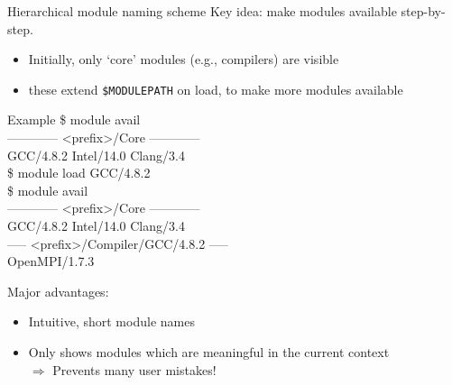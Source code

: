 \documentclass[10pt,xcolor={usenames,dvipsnames}]{beamer}
\begin{document}
\begin{frame}{Hierarchical module naming scheme}
    Key idea: make modules available step-by-step.
    \begin{itemize}
        \item
            Initially, only `core' modules (e.g., compilers) are visible
        \item
            these extend \texttt{\$MODULEPATH} on load, to make
            more modules available
    \end{itemize}
    \enskip
    \begin{minipage}{0.9\textwidth}
        \begin{exampleblock}{Example}
            \ttfamily\footnotesize{
            \$ module avail\\
            ------------ <prefix>/Core ------------\\
            GCC/4.8.2 \quad Intel/14.0 \quad Clang/3.4\\
            \$ module load GCC/4.8.2\\
            \$ module avail\\
            ------------ <prefix>/Core ------------\\
            GCC/4.8.2 \quad Intel/14.0 \quad Clang/3.4\\
            ----- <prefix>/Compiler/GCC/4.8.2 -----\\
            OpenMPI/1.7.3}
        \end{exampleblock}
    \end{minipage}
    \smallskip
    Major advantages:
    \begin{itemize}
        \item
            Intuitive, short module names
        \item
            Only shows modules which are meaningful in the current context\\
            $\Rightarrow$ Prevents many user mistakes!
    \end{itemize}
\end{frame}

\end{document}
